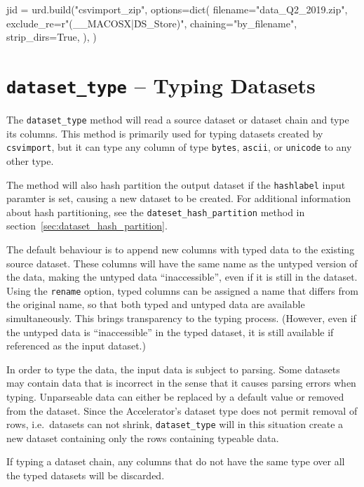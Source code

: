 \begin{python}
    jid = urd.build("csvimport_zip",
        options=dict(
            filename="data_Q2_2019.zip",
            exclude_re=r"(__MACOSX|\.DS_Store)",
            chaining="by_filename",
            strip_dirs=True,
        ),
    )
\end{python}



\clearpage
\section{\texttt{dataset\_type} -- Typing Datasets}
The \texttt{dataset\_type} method will read a source dataset or
dataset chain and type its columns.  This method is primarily used for
typing datasets created by \texttt{csvimport}, but it can type any
column of type \texttt{bytes}, \texttt{ascii}, or \texttt{unicode} to
any other type.

The method will also hash partition the output dataset if the
\texttt{hashlabel} input paramter is set, causing a new dataset to be
created.  For additional information about hash partitioning, see the
\texttt{dateset\_hash_partition} method in section~\ref{sec:dataset_hash_partition}.

The default behaviour is to append new columns with typed data to the
existing source dataset.  These columns will have the same name as the
untyped version of the data, making the untyped data ``inaccessible'',
even if it is still in the dataset.  Using the \texttt{rename} option,
typed columns can be assigned a name that differs from the original
name, so that both typed and untyped data are available
simultaneously.  This brings transparency to the typing process.
(However, even if the untyped data is ``inaccessible'' in the typed
dataset, it is still available if referenced as the input dataset.)

In order to type the data, the input data is subject to parsing.  Some
datasets may contain data that is incorrect in the sense that it
causes parsing errors when typing.  Unparseable data can either be
replaced by a default value or removed from the dataset.  Since the
Accelerator's dataset type does not permit removal of rows,
i.e.\ datasets can not shrink, \texttt{dataset\_type} will in this
situation create a new dataset containing only the rows containing
typeable data.

If typing a dataset chain, any columns that do not have the same type
over all the typed datasets will be discarded.



